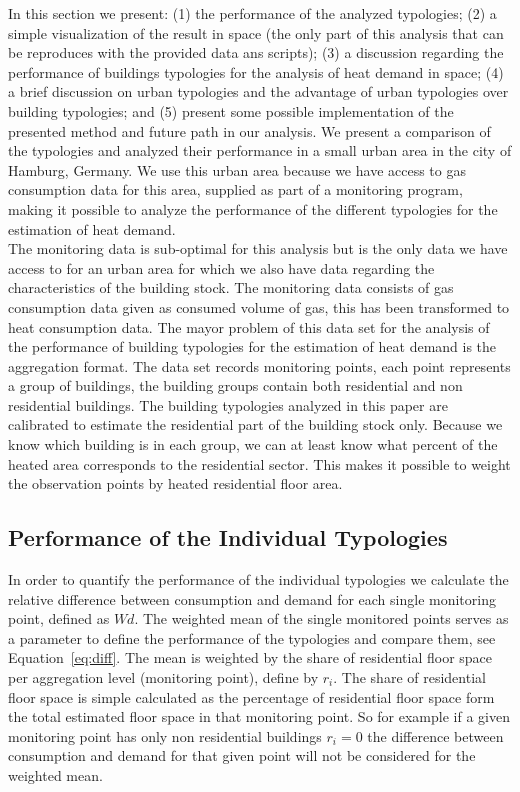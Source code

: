 \documentclass[authoryear,preprint,review,12pt]{elsarticle}
\begin{document}
\begin{linenumbers}
In this section we present: (1) the performance of the analyzed typologies; (2)
a simple visualization of the result in space (the only part of this analysis
that can be reproduces with the provided data ans scripts); (3) a discussion
regarding the performance of buildings typologies for the analysis of heat
demand in space; (4) a brief discussion on urban typologies and the advantage
of urban typologies over building typologies; and (5) present some possible
implementation of the presented method and future path in our analysis.  We
present a comparison of the typologies and analyzed their performance in a
small urban area in the city of Hamburg, Germany. We use this urban area
because we have access to gas consumption data for this area, supplied as part
of a monitoring program, making it possible to analyze the performance of the
different typologies for the estimation of heat demand.\\

The monitoring data is sub-optimal for this analysis but is the only data we
have access to for an urban area for which we also have data regarding the
characteristics of the building stock. The monitoring data consists of gas
consumption data given as consumed volume of gas, this has been transformed to
heat consumption data. The mayor problem of this data set for the analysis of
the performance of building typologies for the estimation of heat demand is the
aggregation format. The data set records monitoring points, each point
represents a group of buildings, the building groups contain both residential
and non residential buildings. The building typologies analyzed in this paper
are calibrated to estimate the residential part of the building stock only.
Because we know which building is in each group, we can at least know what
percent of the heated area corresponds to the residential sector. This makes it
possible to weight the observation points by heated residential floor area.\\

\subsection{Performance of the Individual Typologies}

In order to quantify the performance of the individual typologies we calculate
the relative difference between consumption and demand for each single
monitoring point, defined as $Wd$.  The weighted mean of the single monitored
points serves as a parameter to define the performance of the typologies and
compare them, see Equation~\ref{eq:diff}.  The mean is weighted by the share of
residential floor space per aggregation level (monitoring point), define by
$r_i$. The share of residential floor space is simple calculated as the
percentage of residential floor space form the total estimated floor space in
that monitoring point.  So for example if a given monitoring point has only non
residential buildings $r_i = 0$ the difference between consumption and demand
for that given point will not be considered for the weighted mean.\\


\end{linenumbers}
\end{document}
